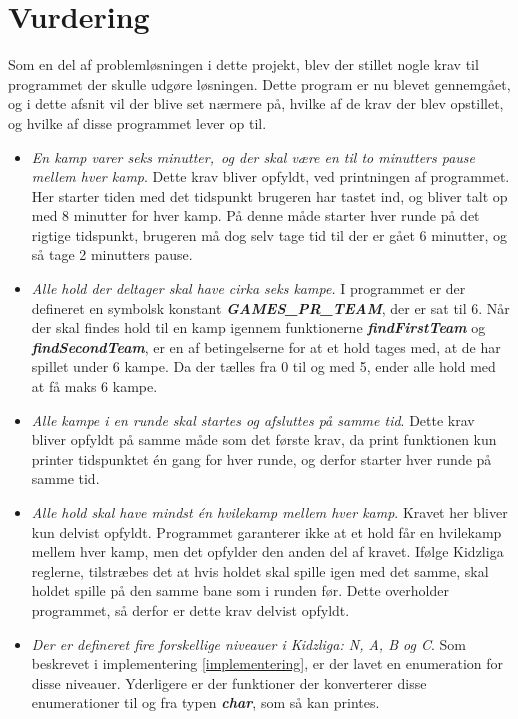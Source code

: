 \chapter{Vurdering}\label{ch:chlabel}
Som en del af problemløsningen i dette projekt, blev der stillet nogle krav til programmet der skulle udgøre løsningen. Dette program er nu blevet gennemgået, og i dette afsnit vil der blive set nærmere på, hvilke af de krav der blev opstillet, og hvilke af disse programmet lever op til.
\begin{itemize}
    \item \textit{En kamp varer seks minutter,\ og der skal være en til to minutters pause mellem hver kamp}. Dette krav bliver opfyldt, ved printningen af programmet. Her starter tiden med det tidspunkt brugeren har tastet ind, og bliver talt op med 8 minutter for hver kamp. På denne måde starter hver runde på det rigtige tidspunkt, brugeren må dog selv tage tid til der er gået 6 minutter, og så tage 2 minutters pause.
    \item \textit{Alle hold der deltager skal have cirka seks kampe.} I programmet er der defineret en symbolsk konstant \textbf{\textit{GAMES\_PR\_TEAM}}, der er sat til 6. Når der skal findes hold til en kamp igennem funktionerne \textbf{\textit{findFirstTeam}} og \textbf{\textit{findSecondTeam}}, er en af betingelserne for at et hold tages med, at de har spillet under 6 kampe. Da der tælles fra 0 til og med 5, ender alle hold med at få maks 6 kampe.
    \item \textit{Alle kampe i en runde skal startes og afsluttes på samme tid}. Dette krav bliver opfyldt på samme måde som det første krav, da print funktionen kun printer tidspunktet én gang for hver runde, og derfor starter hver runde på samme tid.
    \item \textit{Alle hold skal have mindst én hvilekamp mellem hver kamp}. Kravet her bliver kun delvist opfyldt. Programmet garanterer ikke at et hold får en hvilekamp mellem hver kamp, men det opfylder den anden del af kravet. Ifølge Kidzliga reglerne, tilstræbes det at hvis holdet skal spille igen med det samme, skal holdet spille på den samme bane som i runden før. Dette overholder programmet, så derfor er dette krav delvist opfyldt.
    \item \textit{Der er defineret fire forskellige niveauer i Kidzliga: N, A, B og C}. Som beskrevet i implementering \ref{implementering}, er der lavet en enumeration for disse niveauer. Yderligere er der funktioner der konverterer disse enumerationer til og fra typen \textbf{\textit{char}}, som så kan printes.

\end{itemize}
